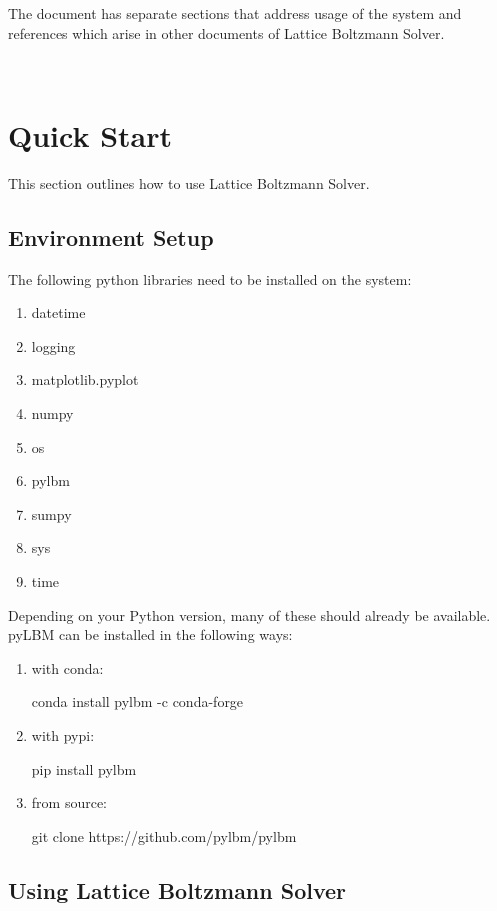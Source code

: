 \documentclass[12pt, titlepage]{article}
\newcommand{\myprogname}{Lattice Boltzmann Solver}
\begin{document}
The document has separate sections that address usage of the system and references which arise in other documents of {\myprogname}.

~\newpage

\section{Quick Start}
\label{quickstart}
This section outlines how to use {\myprogname}.

\subsection{Environment Setup}

The following python libraries need to be installed on the system:
\begin{enumerate}
	\item datetime
	\item logging
	\item matplotlib.pyplot
	\item numpy
	\item os
	\item pylbm
	\item sumpy
	\item sys
	\item time
\end{enumerate}

\noindent Depending on your Python version, many of these should already be available. \\

\noindent pyLBM can be installed in the following ways:

\begin{enumerate}
	\item with conda:
	
	conda install pylbm -c conda-forge
	
	\item with pypi:
	
	pip install pylbm
	
	\item from source:
	
	git clone https://github.com/pylbm/pylbm
\end{enumerate}

\subsection{Using {\myprogname}}
\label{usingprog}
\end{document}
